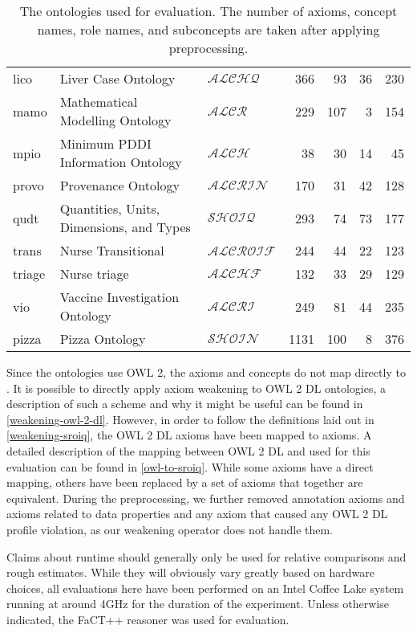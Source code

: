 \begin{table}[ht]
\begin{widepage}
\begin{tabular}{|lllrrrr|}
      lico & Liver Case Ontology & $\mathcal{ALCHQ}$ & 366 & 93 & 36 & 230 \\
      mamo & Mathematical Modelling Ontology & $\mathcal{ALCR}$ & 229 & 107 & 3 & 154 \\
      mpio & Minimum PDDI Information Ontology & $\mathcal{ALCH}$ & 38 & 30 & 14 & 45 \\
      provo & Provenance Ontology & $\mathcal{ALCRIN}$ & 170 & 31 & 42 & 128 \\
      qudt & Quantities, Units, Dimensions, and Types & $\mathcal{SHOIQ}$ & 293 & 74 & 73 & 177 \\
      trans & Nurse Transitional & $\mathcal{ALCROIF}$ & 244 & 44 & 22 & 123 \\
      triage & Nurse triage & $\mathcal{ALCHF}$ & 132 & 33 & 29 & 129 \\
      vio & Vaccine Investigation Ontology & $\mathcal{ALCRI}$ & 249 & 81 & 44 & 235 \\
      pizza & Pizza Ontology & $\mathcal{SHOIN}$ & 1131 & 100 & 8 & 376 \\
      \hline
    \end{tabular}
  \end{widepage}
  \caption{The ontologies used for evaluation. The number of axioms, concept names, role names, and subconcepts are taken after applying preprocessing.}
  \label{table:ontologies}
\end{table}

Since the ontologies use OWL 2, the axioms and concepts do not map directly to \SROIQ. It is possible to directly apply axiom weakening to OWL 2 DL ontologies, a description of such a scheme and why it might be useful can be found in \cref{weakening-owl-2-dl}. However, in order to follow the definitions laid out in \cref{weakening-sroiq}, the OWL 2 DL axioms have been mapped to \SROIQ axioms. A detailed description of the mapping between OWL 2 DL and \SROIQ used for this evaluation can be found in \cref{owl-to-sroiq}. While some axioms have a direct mapping, others have been replaced by a set of axioms that together are equivalent. During the preprocessing, we further removed annotation axioms and axioms related to data properties and any axiom that caused any OWL 2 DL profile violation, as our weakening operator does not handle them.

Claims about runtime should generally only be used for relative comparisons and rough estimates. While they will obviously vary greatly based on hardware choices, all evaluations here have been performed on an Intel Coffee Lake system running at around 4GHz for the duration of the experiment. Unless otherwise indicated, the FaCT++ reasoner \cite{tsarkov2006fact++,factpp} was used for evaluation.

